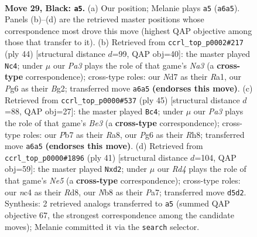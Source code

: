 \documentclass[11pt]{article}
\begin{document}
\clearpage

\begin{figure}[p]\centering
\begin{subfigure}{0.46\textwidth}\centering
\resizebox{\linewidth}{!}{%
\newchessgame
\chessboard[
  setfen={1nb5/rp1n2k1/p3ppp1/3r3p/1bN5/1P2P1PP/PBB1PK2/1R1R4 b - - 4 29},
  showmover=false,
  pgfstyle=straightmove, color=movearrow, markmove={a6-a5}
]}
\caption{}
\end{subfigure}\hfill
\begin{subfigure}{0.46\textwidth}\centering
\resizebox{\linewidth}{!}{%
\newchessgame
\chessboard[
  setfen={r2r2k1/pp1b1pb1/2n1p1pp/3nP3/5P2/NPB2NP1/1P4BP/R2R2K1 w - - 1 23},
  showmover=false,
  pgfstyle=straightmove, color=movearrow, markmove={a3-c4}
]}
\caption{}
\end{subfigure}
\\[4pt]
\begin{subfigure}{0.46\textwidth}\centering
\resizebox{\linewidth}{!}{%
\newchessgame
\chessboard[
  setfen={r6r/pp4p1/n1nBbkBp/4p3/3p3N/P6P/2P2PP1/4RRK1 b - - 3 23},
  showmover=false,
  pgfstyle=straightmove, color=movearrow, markmove={e6-c4}
]}
\caption{}
\end{subfigure}\hfill
\begin{subfigure}{0.46\textwidth}\centering
\resizebox{\linewidth}{!}{%
\newchessgame
\chessboard[
  setfen={3r2k1/p3bpp1/nr1pp2p/2p5/2P1n3/4P2P/PP1NBPPB/1R1R2K1 b - - 1 21},
  showmover=false,
  pgfstyle=straightmove, color=movearrow, markmove={e4-d2}
]}
\caption{}
\end{subfigure}
\caption{\textbf{Move 29, Black: \texttt{a5}.} (a) Our position; Melanie plays \texttt{a5} (\texttt{a6a5}). Panels (b)--(d) are the retrieved master positions whose correspondence most drove this move (highest QAP objective among those that transfer to it). (b) Retrieved from \texttt{ccrl\_top\_p0002\#217} (ply 44) [structural distance $d$=99, QAP obj=40]: the master played \texttt{Nc4}; under $\mu$ our \emph{Pa3} plays the role of that game's \emph{Na3} (a \textbf{cross-type} correspondence); cross-type roles: our \emph{N}d7 as their \emph{R}a1, our \emph{P}g6 as their \emph{B}g2; transferred move \texttt{a6a5} \textbf{(endorses this move)}. (c) Retrieved from \texttt{ccrl\_top\_p0000\#537} (ply 45) [structural distance $d$=88, QAP obj=27]: the master played \texttt{Bc4}; under $\mu$ our \emph{Pa3} plays the role of that game's \emph{Be3} (a \textbf{cross-type} correspondence); cross-type roles: our \emph{P}b7 as their \emph{R}a8, our \emph{P}g6 as their \emph{R}h8; transferred move \texttt{a6a5} \textbf{(endorses this move)}. (d) Retrieved from \texttt{ccrl\_top\_p0000\#1896} (ply 41) [structural distance $d$=104, QAP obj=59]: the master played \texttt{Nxd2}; under $\mu$ our \emph{Rd4} plays the role of that game's \emph{Ne5} (a \textbf{cross-type} correspondence); cross-type roles: our \emph{n}c4 as their \emph{R}d8, our \emph{N}b8 as their \emph{P}a7; transferred move \texttt{d5d2}. Synthesis: 2 retrieved analogs transferred to \texttt{a5} (summed QAP objective 67, the strongest correspondence among the candidate moves); Melanie committed it via the \texttt{search} selector.}
\label{fig:thought-m57}
\end{figure}
\end{document}
